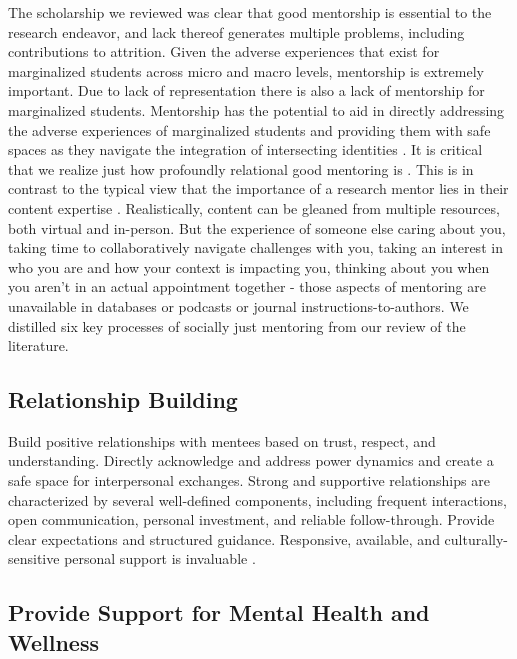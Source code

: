 \documentclass[
  11pt,
]{book}
\begin{document}
The scholarship we reviewed was clear that good mentorship is essential to the research endeavor, and lack thereof generates multiple problems, including contributions to attrition. Given the adverse experiences that exist for marginalized students across micro and macro levels, mentorship is extremely important. Due to lack of representation there is also a lack of mentorship for marginalized students. Mentorship has the potential to aid in directly addressing the adverse experiences of marginalized students and providing them with safe spaces as they navigate the integration of intersecting identities . It is critical that we realize just how profoundly relational good mentoring is \citep{cannon_relational_2020}. This is in contrast to the typical view that the importance of a research mentor lies in their content expertise \citep{mangione_mentoring_2018}. Realistically, content can be gleaned from multiple resources, both virtual and in-person. But the experience of someone else caring about you, taking time to collaboratively navigate challenges with you, taking an interest in who you are and how your context is impacting you, thinking about you when you aren't in an actual appointment together - those aspects of mentoring are unavailable in databases or podcasts or journal instructions-to-authors. We distilled six key processes of socially just mentoring from our review of the literature.

\subsection{Relationship Building}\label{relationship-building}

Build positive relationships with mentees based on trust, respect, and understanding. Directly acknowledge and address power dynamics and create a safe space for interpersonal exchanges. Strong and supportive relationships are characterized by several well-defined components, including frequent interactions, open communication, personal investment, and reliable follow-through. Provide clear expectations and structured guidance. Responsive, available, and culturally-sensitive personal support is invaluable \citep{ajjawi_what_2018, haeger_creating_2021, cirillo-mccarthy_developing_2022}.

\subsection{Provide Support for Mental Health and Wellness}\label{provide-support-for-mental-health-and-wellness}
\end{document}
